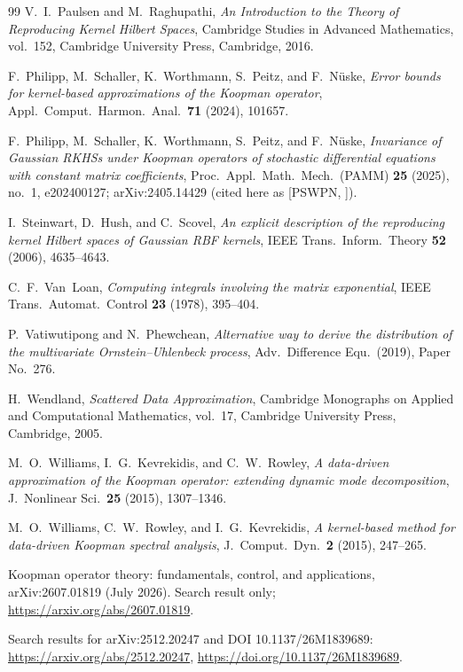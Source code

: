 \documentclass[11pt]{amsart}
\newcommand{\PS}[1][]{[PSWPN\ifx\relax#1\relax\else, #1\fi]}
\begin{document}
\begin{thebibliography}{99}
V.~I.~Paulsen and M.~Raghupathi, \emph{An Introduction to the Theory of Reproducing Kernel Hilbert Spaces}, Cambridge
Studies in Advanced Mathematics, vol.~152, Cambridge University Press, Cambridge, 2016.

F.~Philipp, M.~Schaller, K.~Worthmann, S.~Peitz, and F.~N\"uske, \emph{Error bounds for kernel-based approximations of
the Koopman operator}, Appl.\ Comput.\ Harmon.\ Anal.\ \textbf{71} (2024), 101657.

F.~Philipp, M.~Schaller, K.~Worthmann, S.~Peitz, and F.~N\"uske, \emph{Invariance of Gaussian RKHSs under Koopman
operators of stochastic differential equations with constant matrix coefficients}, Proc.\ Appl.\ Math.\ Mech.\
(PAMM) \textbf{25} (2025), no.~1, e202400127; arXiv:2405.14429 (cited here as \PS).

I.~Steinwart, D.~Hush, and C.~Scovel, \emph{An explicit description of the reproducing kernel Hilbert spaces of
Gaussian RBF kernels}, IEEE Trans.\ Inform.\ Theory \textbf{52} (2006), 4635--4643.

C.~F.~Van~Loan, \emph{Computing integrals involving the matrix exponential}, IEEE Trans.\ Automat.\ Control
\textbf{23} (1978), 395--404.

P.~Vatiwutipong and N.~Phewchean, \emph{Alternative way to derive the distribution of the multivariate
Ornstein--Uhlenbeck process}, Adv.\ Difference Equ.\ (2019), Paper No.~276.

H.~Wendland, \emph{Scattered Data Approximation}, Cambridge Monographs on Applied and Computational Mathematics,
vol.~17, Cambridge University Press, Cambridge, 2005.

M.~O.~Williams, I.~G.~Kevrekidis, and C.~W.~Rowley, \emph{A data-driven approximation of the Koopman operator:
extending dynamic mode decomposition}, J.\ Nonlinear Sci.\ \textbf{25} (2015), 1307--1346.

M.~O.~Williams, C.~W.~Rowley, and I.~G.~Kevrekidis, \emph{A kernel-based method for data-driven Koopman spectral
analysis}, J.\ Comput.\ Dyn.\ \textbf{2} (2015), 247--265.

Koopman operator theory: fundamentals, control, and applications, arXiv:2607.01819 (July 2026). Search result only;
\url{https://arxiv.org/abs/2607.01819}.

Search results for arXiv:2512.20247 and DOI 10.1137/26M1839689: \url{https://arxiv.org/abs/2512.20247},
\url{https://doi.org/10.1137/26M1839689}.


\end{thebibliography}
\end{document}
